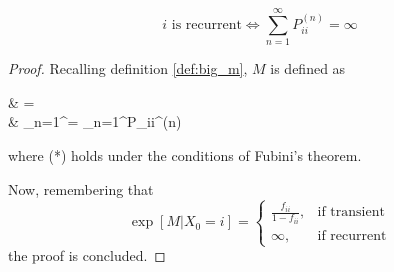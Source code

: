	\begin{theorem}
		\label{th:iff_recurrent}
		$$i  \text{ is recurrent}
			\iff \sum_{n=1}^\infty P_{ii}^{(n)} = \infty$$
	\end{theorem}

	\begin{proof}
		Recalling definition \ref{def:big_m}, $M$ is defined as
		\begin{esp}
			\exp[M | X_0 = i]
				& = \exp\left[\sum_{n=1}^\infty \indicator{1}\{X_n = i\} | X_0 = i\right] \\
				& \stackrel{(*)}{=} \sum_{n=1}^\infty \exp\left[\indicator{1}\{ X_n = i\} | X_0 = i\right]
				= \sum_{n=1}^\infty P_{ii}^{(n)}
		\end{esp}
		where (*) holds under the conditions of Fubini's theorem.

		Now, remembering that
			\begin{equation}
				\exp[M | X_0 = i] = \begin{cases}
				\frac{f_{ii}}{1-f_{ii}}, & \text{if transient} \\
				\infty, & \text{if recurrent}
				\end{cases}
			\end{equation}
		the proof is concluded.
	\end{proof}

